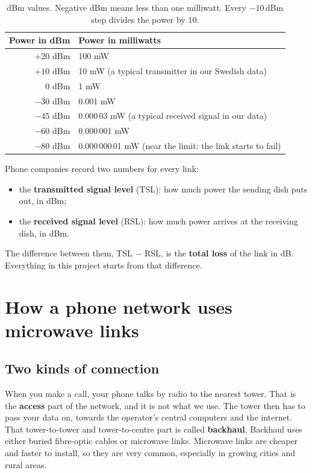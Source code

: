 \documentclass[11pt,a4paper]{article}
\begin{document}
\begin{table}[h]
\centering\small
\begin{tabular}{rl}
\toprule
Power in dBm & Power in milliwatts \\
\midrule
$+20$ dBm & 100 mW \\
$+10$ dBm & 10 mW (a typical transmitter in our Swedish data) \\
$0$ dBm & 1 mW \\
$-30$ dBm & 0.001 mW \\
$-45$ dBm & 0.000\,03 mW (a typical received signal in our data) \\
$-60$ dBm & 0.000\,001 mW \\
$-80$ dBm & 0.000\,000\,01 mW (near the limit: the link starts to fail) \\
\bottomrule
\end{tabular}
\caption{dBm values. Negative dBm means less than one milliwatt. Every $-10$\,dBm step divides the power by 10.}
\end{table}

Phone companies record two numbers for every link:
\begin{itemize}
\item the \textbf{transmitted signal level} (TSL): how much power the sending dish puts out, in dBm;
\item the \textbf{received signal level} (RSL): how much power arrives at the receiving dish, in dBm.
\end{itemize}
The difference between them, TSL $-$ RSL, is the \textbf{total loss} of the link in dB. Everything in
this project starts from that difference.

\section{How a phone network uses microwave links}
\label{sec:network}

\subsection{Two kinds of connection}

When you make a call, your phone talks by radio to the nearest tower. That is the
\textbf{access} part of the network, and it is not what we use. The tower then has to pass your data
on, towards the operator's central computers and the internet. That tower-to-tower and
tower-to-centre part is called \textbf{backhaul}. Backhaul uses either buried fibre-optic cables or
microwave links. Microwave links are cheaper and faster to install, so they are very common,
especially in growing cities and rural areas.
\end{document}
